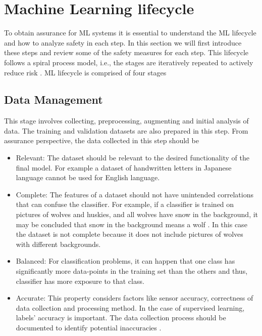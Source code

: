 \section{Machine Learning lifecycle}

To obtain assurance for ML systems it is essential to understand the ML lifecycle and how to analyze safety in each step. In this section we will first introduce these steps and review some of the safety measures for each step. This lifecycle follows a spiral process model, i.e., the stages are iteratively repeated to actively reduce risk \cite{Boehm2000}. ML lifecycle is comprised of four stages \cite{Ashmore2021} 

\subsection{Data Management}
This stage involves collecting, preprocessing, augmenting and initial analysis of data. The training and validation datasets are also prepared in this step.
From assurance perspective, the data collected in this step should be
\begin{itemize}
    \item Relevant: The dataset should be relevant to the desired functionality of the final model. For example a dataset of handwritten letters in Japanese language cannot be used for English language. 
    \item Complete: The features of a dataset should not have unintended correlations that can confuse the classifier. For example, if a classifier is trained on pictures of wolves and huskies, and all wolves have snow in the background, it may be concluded that snow in the background means a wolf \cite{Ribeiro2016}. In this case the dataset is not complete because it does not include pictures of wolves with different backgrounds.
    \item Balanced: For classification problems, it can happen that one class has significantly more data-points in the training set than the others and thus, classifier has more exposure to that class. 
    \item Accurate: This property considers factors like sensor accuracy, correctness of data collection and processing method. In the case of supervised learning, labels' accuracy is important. The data collection process should be documented to identify potential inaccuracies \cite{Ashmore2021}.
\end{itemize} 

